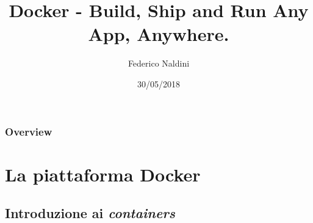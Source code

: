 \documentclass{beamer}
\title[Docker]{Docker - Build, Ship and Run Any App, Anywhere. } %
\author{Federico Naldini} %
\institute[Unibo] %
{
Alma Mater Studiorum - Università di Bologna, Cesena. \\ %
\medskip
\textit{federico.naldini3@studio.unibo.it} %
}
\date{30/05/2018} %
\begin{document}
\begin{frame}
\titlepage %
\end{frame}

\begin{frame}
\frametitle{Overview} %
\tableofcontents %
\end{frame}

\section{La piattaforma Docker} %

\subsection{Introduzione ai \textit{containers}}


\end{document}
